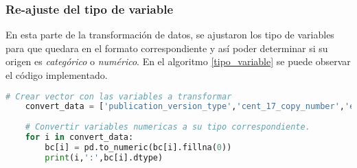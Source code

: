 \subsubsection{Re-ajuste del tipo de variable }
En esta parte de la transformación de datos, se ajustaron los tipo de variables para que quedara en el formato correspondiente y así poder determinar si su origen es \textit{categórico} o \textit{numérico}. En el algoritmo \ref{tipo_variable} se puede observar el código implementado. 

\begin{lstlisting}[basicstyle=\scriptsize,language=Python, label=tipo_variable, caption=Re-ajustar tipo de variables en Python.]
	# Crear vector con las variables a transformar
	convert_data = ['publication_version_type','cent_17_copy_number','er_positivity_scale_used','her_2_copy_number','her_2_ihc_score','ihc_score','positive_lymph_keratin','pr_positivity_ihc_intensity_score','pr_positivity_scale_used','fraction_genome_altered','number_samples','tmb_nonsynonymous','her_2_cent_17_ratio','lymph_examined_number','mutation_count','overall_survival_months','disease_free_months','days_last_followup']
	
	# Convertir variables numericas a su tipo correspondiente.
	for i in convert_data:
		bc[i] = pd.to_numeric(bc[i].fillna(0))
		print(i,':',bc[i].dtype)
\end{lstlisting}


